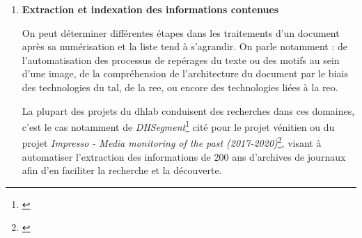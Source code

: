 \begin{enumerate}
La numérisation du patrimoine bâti implique l'utilisation des techniques de la \gls{photo} et l'alignement de différents nuages de points. L'ambition de Time Machine étant à l'échelle de villes, les technologies actuelles devront être améliorées. Le projet \textit{ScanVan (2016-2020)}, conduit par le \gls{dhlab}, a pour objectif le développement d'un véhicule capable de numériser les villes et de créer automatiquement des modèles 3D de ces territoires\footnote{\cite{epfl.dhlab_2016_nodate}}. 
\begin{figure}[H]%
\centering
\texttt{[image: ScanVan.jpg]}
\caption{Ville de Sion, compilée par ScanVan \textit{© Copyright EPFL DHLAB}}
\end{figure}
Iconem\footnote{\cite{iconem_iconem_nodate}}, start-up partenaire du projet, s'est spécialisée dans la numérisation de sites patrimoniaux en danger, grâce à des drones et à des processus de \gls{photo}. Par la mise en commun de ces développements technologiques, Time Machine vise à la création et à l'implémentation d'un système des plus efficients.
\item \textbf{Extraction et indexation des informations contenues} 

On peut déterminer différentes étapes dans les traitements d'un document après sa numérisation et la liste tend à s'agrandir. On parle notamment : de l'automatisation des processus de repérages du texte ou des motifs au sein d'une image, de la compréhension de l'architecture du document par le biais des technologies du \gls{tal}, de la \gls{ree}, ou encore des technologies liées à la \gls{reo}.

 La plupart des projets du \gls{dhlab} conduisent des recherches dans ces domaines, c'est le cas notamment de \textit{DHSegment}\footnote{\cite{epfl.dhlab_introduction_nodate}} cité pour le projet vénitien ou du projet \textit{Impresso - Media monitoring of the past (2017-2020)}\footnote{\cite{epfl.dhlab_2017-2020_nodate}}, visant à automatiser l'extraction des informations de 200 ans d'archives de journaux afin d'en faciliter la recherche et la découverte. 


\end{enumerate}
